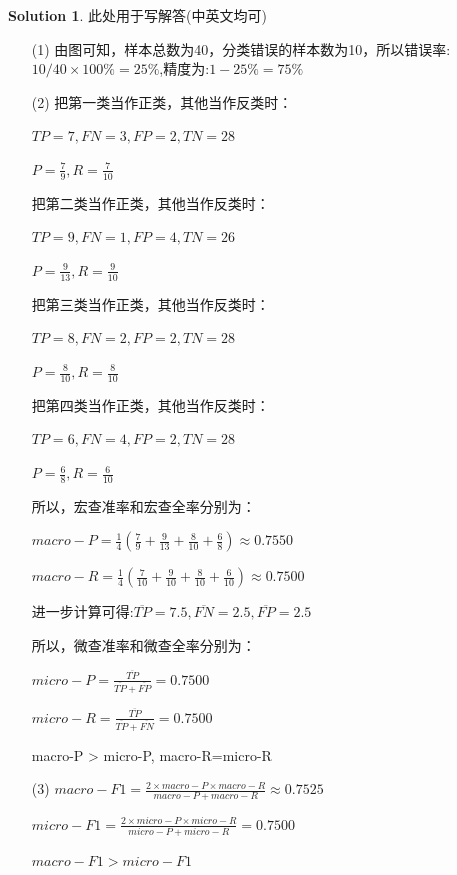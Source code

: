 \documentclass[a4paper,UTF8]{article}
\numberwithin{equation}{section}
\theoremstyle{definition}
\newtheorem*{solution}{Solution}
\begin{document}
	
	\begin{solution}
		此处用于写解答(中英文均可)\\
  \begin{enumerate}
      \item[(1)]
      由图可知，样本总数为40，分类错误的样本数为10，所以错误率:$10/40\times 100\% = 25\%$,精度为:$1-25\% = 75\%$
      \item[(2)]
      把第一类当作正类，其他当作反类时：

        $TP=7,FN=3,FP=2,TN=28$

        $P=\frac{7}{9},R=\frac{7}{10}$

        把第二类当作正类，其他当作反类时：

        $TP=9,FN=1,FP=4,TN=26$

        $P=\frac{9}{13},R=\frac{9}{10}$

        把第三类当作正类，其他当作反类时：

        $TP=8,FN=2,FP=2,TN=28$

        $P=\frac{8}{10},R=\frac{8}{10}$

        把第四类当作正类，其他当作反类时：

        $TP=6,FN=4,FP=2,TN=28$

        $P=\frac{6}{8},R=\frac{6}{10}$

        所以，宏查准率和宏查全率分别为：

        $macro-P=\frac{1}{4}(\frac{7}{9}+\frac{9}{13}+\frac{8}{10}+\frac{6}{8})\approx 0.7550$

        $macro-R=\frac{1}{4}(\frac{7}{10}+\frac{9}{10}+\frac{8}{10}+\frac{6}{10})\approx 0.7500$

        进一步计算可得:$\overline {TP}=7.5,\overline {FN}=2.5, \overline {FP}=2.5$

        所以，微查准率和微查全率分别为：

        $micro-P=\frac{\overline {TP}}{\overline {TP}+\overline {FP}}=0.7500$

        $micro-R=\frac{\overline {TP}}{\overline {TP}+\overline {FN}}=0.7500$

        macro-P > micro-P, macro-R=micro-R
      \item[(3)]
      $macro-F1=\frac{2\times macro-P \times macro-R}{macro-P + macro-R} \approx0.7525$ 

      $micro-F1=\frac{2\times micro-P \times micro-R}{micro-P + micro-R} =0.7500$

      $macro-F1>micro-F1$
  \end{enumerate}
		~\\
		~\\
		~\\
	\end{solution}
	
\end{document}
